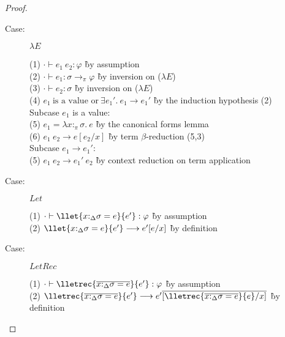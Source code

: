 \begin{proof}
\begin{description}
\item[Case:] $\lambda E$
\begin{tabbing}
(1) $\cdot \vdash e_1~e_2 : \varphi$ \` by assumption \\
(2) $\cdot \vdash e_1 : \sigma \to_\pi \varphi$ \` by inversion on ($\lambda E$) \\
(3) $\cdot \vdash e_2 : \sigma$ \` by inversion on ($\lambda E$) \\
(4) $e_1~\textrm{is a value or}~\exists e_1'.~e_1\longrightarrow e_1'$ \` by the induction hypothesis (2) \\
\textrm{Subcase $e_1$ is a value:}\\
(5) $e_1 = \lambda x{:}_\pi\sigma.~e$ \` by the canonical forms lemma \\
(6) $e_1~e_2 \longrightarrow e[e_2/x]$ \` by term $\beta$-reduction (5,3) \\
\textrm{Subcase $e_1\longrightarrow e_1'$:}\\
(5) $e_1~e_2\longrightarrow e_1'~e_2$ \` by context reduction on term application \\
\end{tabbing}

\item[Case:] $Let$
\begin{tabbing}
(1) $\cdot \vdash \llet{x{:}_\Delta\sigma = e}{e'} : \varphi$ \` by assumption \\
(2) $\llet{x{:}_\Delta\sigma = e}{e'}\longrightarrow e'[e/x]$ \` by definition\\
\end{tabbing}

\item[Case:] $LetRec$
\begin{tabbing}
(1) $\cdot \vdash \lletrec{\overline{x{:}_\Delta\sigma = e}}{e'} : \varphi$ \` by assumption \\
(2) $\lletrec{\overline{x{:}_\Delta\sigma = e}}{e'} \longrightarrow e'\overline{[\lletrec{\overline{x{:}_\Delta\sigma = e}}{e}/x]}$ \` by definition\\
\end{tabbing}


\end{description}
\end{proof}
